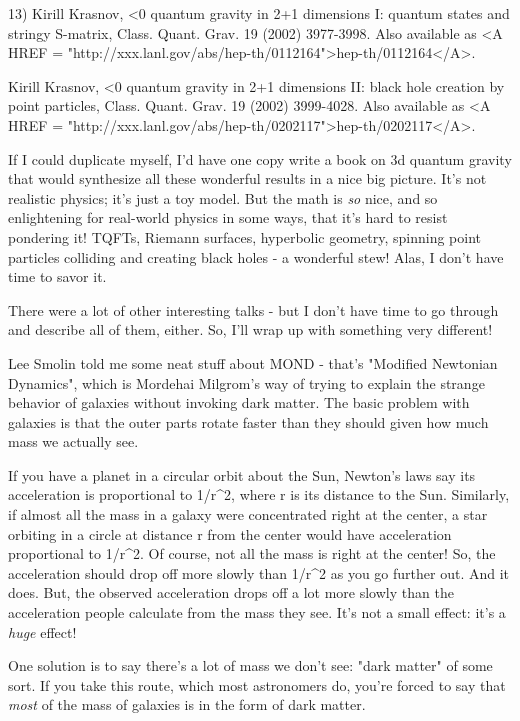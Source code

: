13) Kirill Krasnov, \Lambda <0 quantum gravity in 2+1 dimensions I:
quantum states and stringy S-matrix, Class. Quant. Grav. 19 (2002) 
3977-3998.  Also available 
as <A HREF = "http://xxx.lanl.gov/abs/hep-th/0112164">hep-th/0112164</A>.

Kirill Krasnov, \Lambda <0 quantum gravity in 2+1 dimensions II: 
black hole creation by point particles, Class. Quant. Grav. 19 (2002) 
3999-4028.  Also available 
as <A HREF = "http://xxx.lanl.gov/abs/hep-th/0202117">hep-th/0202117</A>.

If I could duplicate myself, I'd have one copy write a book on 3d quantum 
gravity that would synthesize all these wonderful results in a nice big 
picture.  It's not realistic physics; it's just a toy model.  But the 
math is \emph{so} nice, and so enlightening for real-world physics in some 
ways, that it's hard to resist pondering it!  TQFTs, Riemann surfaces,
hyperbolic geometry, spinning point particles colliding and creating
black holes - a wonderful stew!  Alas, I don't have time to savor it.

There were a lot of other interesting talks - but I don't have time to go 
through and describe all of them, either.  So, I'll wrap up with something
very different!  

Lee Smolin told me some neat stuff about MOND - that's "Modified 
Newtonian Dynamics", which is Mordehai Milgrom's way of trying to explain 
the strange behavior of galaxies without invoking dark matter.  The basic 
problem with galaxies is that the outer parts rotate faster than they 
should given how much mass we actually see.  

If you have a planet in a circular orbit about the Sun, Newton's laws 
say its acceleration is proportional to 1/r^{2}, 
where r is its distance to 
the Sun.  Similarly, if almost all the mass in a galaxy were concentrated
right at the center, a star orbiting in a circle at distance r from the 
center would have acceleration proportional to 1/r^{2}.  
Of course, not all
the mass is right at the center!  So, the acceleration should drop off 
more slowly than 1/r^{2} 
as you go further out.  And it does.  But, the 
observed acceleration drops off a lot more slowly than the acceleration 
people calculate from the mass they see.  It's not a small effect: it's a 
\emph{huge} effect!

One solution is to say there's a lot of mass we don't 
see: "dark matter"
of some sort.  If you take this route, which most astronomers do, you're
forced to say that \emph{most} 
of the mass of galaxies is in the form of dark 
matter.

